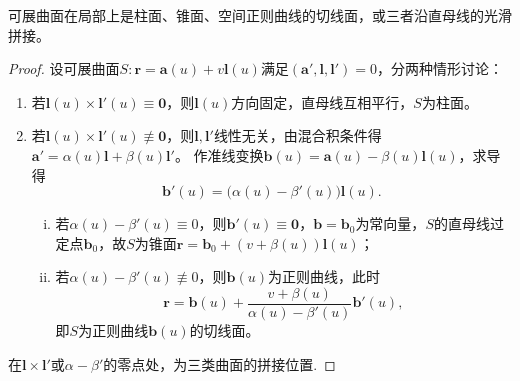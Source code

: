 \documentclass[../../main.tex]{subfiles}%
\begin{document}
\begin{theorem}
可展曲面在局部上是柱面、锥面、空间正则曲线的切线面，或三者沿直母线的光滑拼接。
\end{theorem}
\begin{proof}
设可展曲面$S:\bm r=\bm a(u)+v\bm l(u)$满足$(\bm a',\bm l,\bm l')=0$，分两种情形讨论：

\begin{enumerate}[(1)]
\item 若$\bm l(u)\times\bm l'(u)\equiv\bm 0$，则$\bm l(u)$方向固定，直母线互相平行，$S$为柱面。
\item 若$\bm l(u)\times\bm l'(u)\not\equiv\bm 0$，则$\bm l,\bm l'$线性无关，由混合积条件得$\bm a'=\alpha(u)\bm l+\beta(u)\bm l'$。
作准线变换$\bm b(u)=\bm a(u)-\beta(u)\bm l(u)$，求导得
$$\bm b'(u)=\big(\alpha(u)-\beta'(u)\big)\bm l(u).$$
\begin{enumerate}[(i)]
\item 若$\alpha(u)-\beta'(u)\equiv0$，则$\bm b'(u)\equiv\bm 0$，$\bm b=\bm b_0$为常向量，$S$的直母线过定点$\bm b_0$，故$S$为锥面$\bm r=\bm b_0+(v+\beta(u))\bm l(u)$；
\item 若$\alpha(u)-\beta'(u)\not\equiv0$，则$\bm b(u)$为正则曲线，此时
$$\bm r=\bm b(u)+\frac{v+\beta(u)}{\alpha(u)-\beta'(u)}\bm b'(u),$$
即$S$为正则曲线$\bm b(u)$的切线面。
\end{enumerate}
\end{enumerate}

在$\bm l\times\bm l'$或$\alpha-\beta'$的零点处，为三类曲面的拼接位置.
\end{proof}
\end{document}
